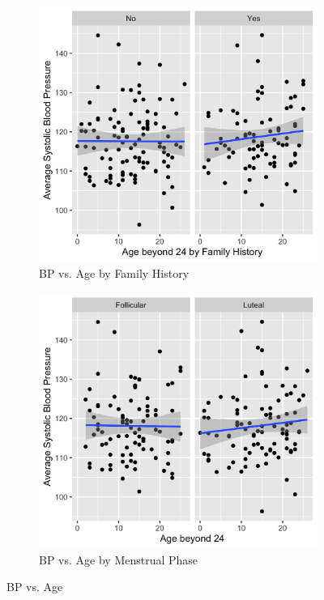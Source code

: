 \documentclass[12pt,twoside,leqno,fleqn,letterpaper]{article}
\theoremstyle{definition}
\theoremstyle{definition}
\begin{document}
\begin{appendices}
\begin{figure}[h]
\begin{subfigure}[b]{0.3\textwidth}
        \includegraphics[width=\textwidth]{pics/bp by age and fh.png}
        \caption[]%
        {{\small BP vs. Age by Family History}}
        \label{fig: bp v age and fh}
        \end{subfigure}
        \hfill
        \begin{subfigure}[b]{0.3\textwidth}
        \centering
        \includegraphics[width=\textwidth]{pics/bp by age and phase.png}
        \caption[]%
        {{\small BP vs. Age by Menstrual Phase}}
        \label{fig: bp v age and phase}
        \end{subfigure}
        \caption[]
        {\small BP vs. Age}
        \label{fig: bp v age and lv 2}
        \end{figure}


\end{appendices}
\end{document}
